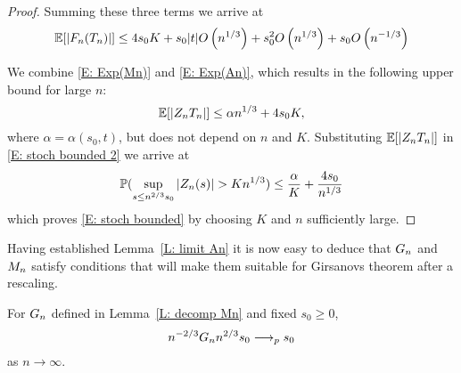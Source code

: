 \begin{proof}
    Summing these three terms we arrive at
    \begin{equation} \label{E: Exp(An)}
    \mathbb{E}[|F_n(T_n)|] \leq 4 s_0 K + s_0|t|O\left(n^{1 / 3}\right) + s_0^2O\left(n^{1 / 3}\right) + s_0O\left(n^{-1 / 3}\right)
    \end{equation}
    
    We combine \eqref{E: Exp(Mn)} and \eqref{E: Exp(An)}, 
    which results in the following upper bound for large $n$:
    \begin{equation} \label{E: bound Zn}
    \mathbb{E}[|Z_n{T_n}|] \leq \alpha n^{1 / 3} + 4s_0K,
    \end{equation}
    where $\alpha = \alpha(s_0,t)$, but does not depend on $n$ and $K$. 
    Substituting $\mathbb{E}[|Z_n{T_n}|]$ in \eqref{E: stoch bounded 2} we arrive at
    \begin{equation}
    \mathbb{P}( \sup_{s\leq n^{2/3} s_0} |Z_n(s)| > K n^{1 / 3} ) \leq \frac{\alpha}{K} + \frac{4s_0}{n^{1 / 3}}
    \end{equation}
    which proves \eqref{E: stoch bounded} by choosing $K$ and $n$ sufficiently large.
\end{proof}

Having established Lemma~\ref{L: limit An} it is now easy to deduce that $G_n$ and $M_n$ satisfy conditions 
that will make them suitable for Girsanovs theorem after a rescaling.

\begin{lemma} \label{L: limit Bn}
	For $G_n$ defined in Lemma~\ref{L: decomp Mn} and fixed $s_0 \geq 0$,
	\begin{equation} \label{E: limit Bn}
	n^{-2 / 3} G_n{n^{2 / 3}s_0} \longrightarrow_p s_0
	\end{equation}
	as $n \rightarrow \infty$.
\end{lemma}

